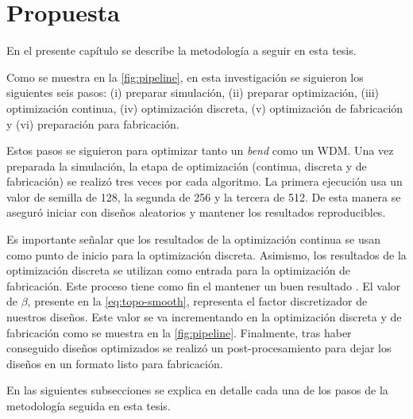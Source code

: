 \chapter{Propuesta}

En el presente capítulo se describe la metodología a seguir en esta tesis.

Como se muestra en la \autoref{fig:pipeline}, en esta investigación se siguieron los siguientes seis pasos:
(i) preparar simulación, 
(ii) preparar optimización, 
(iii) optimización continua,
(iv) optimización discreta,
(v) optimización de fabricación y
(vi) preparación para fabricación.

Estos pasos se siguieron para optimizar tanto un \emph{bend} como un WDM.
Una vez preparada la simulación, la etapa de optimización (continua, discreta y de fabricación) se realizó
tres veces por cada algoritmo.
La primera ejecución usa un valor de semilla de 128, la segunda de 256 y la tercera de 512.
De esta manera se aseguró iniciar con diseños aleatorios y mantener los resultados reproducibles.

Es importante señalar que los resultados de la optimización continua se usan como punto de inicio
para la optimización discreta. Asimismo, los resultados de la optimización discreta se utilizan como
entrada para la optimización de fabricación.
Este proceso tiene como fin el mantener un buen resultado \citep{Yang2017}.
El valor de $\beta$, presente en la \autoref{eq:topo-smooth}, representa el factor discretizador de nuestros diseños.
Este valor se va incrementando en la optimización discreta y de fabricación como se muestra en la
\autoref{fig:pipeline}.
Finalmente, tras haber conseguido diseños optimizados se realizó un post-procesamiento para dejar los diseños
en un formato listo para fabricación.

En las siguientes subsecciones se explica en detalle cada una de los pasos de la metodología seguida en esta tesis.

